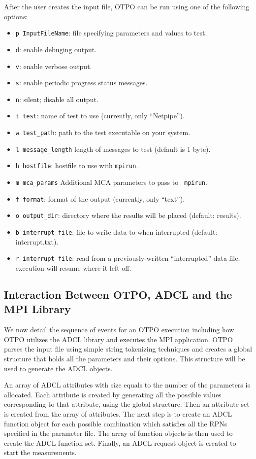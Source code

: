 After the user creates the input file, OTPO can be run using one of the following options:
\begin{itemize}
\item {\tt p InputFileName}: file specifying parameters and values to test.
\item {\tt d}: enable debuging output.
\item {\tt v}: enable verbose output.
\item {\tt s}: enable periodic progress status messages.
\item {\tt n}: silent; disable all output.
\item {\tt t test}: name of test to use (currently, only ``Netpipe'').
\item {\tt w test\_\-path}: path to the test executable on your
  system.
\item {\tt l message\_\-length} length of messages to test (default is
  1 byte).
\item {\tt h hostfile}: hostfile to use with {\tt mpirun}.
\item {\tt m mca\_\-params} Additional MCA parameters to pass to {\tt
    mpirun}.
\item {\tt f format}: format of the output (currently, only ``text'').
\item {\tt o output\_\-dir}: directory where the results will be
  placed (default: results).
\item {\tt b interrupt\_\-file}: file to write data to when
  interrupted (default: interrupt.txt).
\item {\tt r interrupt\_\-file}: read from a previously-written
  ``interrupted'' data file; execution will resume where it left off.
\end{itemize}

\subsection{Interaction Between OTPO, ADCL and the MPI Library}

We now detail the sequence of events for an OTPO execution including
how OTPO utilizes the ADCL library and executes the MPI
application. OTPO parses the input file using simple string tokenizing
techniques and creates a global structure that holds all the
parameters and their options. This structure will be used to generate
the ADCL objects.

An array of ADCL attributes with size equals to the number of the
parameters is allocated. Each attribute is created by generating all
the possible values corresponding to that attribute, using the global
structure. Then an attribute set is created from the array of
attributes. The next step is to create an ADCL function object for
each possible combination which satisfies all the RPNs specified in
the parameter file. The array of function objects is then used to
create the ADCL function set.  Finally, an ADCL request object is
created to start the measurements.

